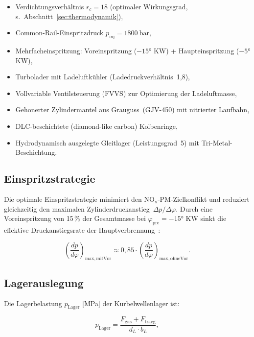 ﻿\documentclass[12pt,a4paper]{article}
\newcommand{\NOx}{\ensuremath{\mathrm{NO_x}}}
\newcommand{\rc}{\ensuremath{r_c}}
\begin{document}
\begin{itemize}
  \item Verdichtungsverhältnis $\rc = 18$ (optimaler Wirkungsgrad, s.\
        Abschnitt~\ref{sec:thermodynamik}),
  \item Common-Rail-Einspritzdruck $p_{\mathrm{inj}} = \SI{1800}{\bar}$,
  \item Mehrfacheinspritzung: Voreinspritzung ($-15 °$ KW) + Haupteinspritzung ($-5 °$ KW),
  \item Turbolader mit Ladeluftkühler (Ladedruckverhältnis~1{,}8),
  \item Vollvariable Ventilsteuerung (FVVS) zur Optimierung der Ladeluftmasse,
  \item Gehonerter Zylindermantel aus Grauguss~(GJV-450) mit nitrierter Laufbahn,
  \item DLC-beschichtete (diamond-like carbon) Kolbenringe,
  \item Hydrodynamisch ausgelegte Gleitlager (Leistungsgrad~5) mit
        Tri-Metal-Beschichtung.
\end{itemize}

\subsection{Einspritzstrategie}
\label{sec:motor_einspritzung}

Die optimale Einspritzstrategie minimiert den $\NOx$-PM-Zielkonflikt und
reduziert gleichzeitig den maximalen Zylinderdruckanstieg~$\Delta p / \Delta\varphi$.
Durch eine Voreinspritzung von 15\,\% der Gesamtmasse bei $\varphi_{\mathrm{pre}} = -15 °$ KW
sinkt die effektive Druckanstiegsrate der Hauptverbrennung~\cite{mollenhauer2010}:

\begin{equation}
  \left(\frac{dp}{d\varphi}\right)_{\mathrm{max, mit Vor}} \approx
  0{,}85 \cdot \left(\frac{dp}{d\varphi}\right)_{\mathrm{max, ohne Vor}}.
\end{equation}

\subsection{Lagerauslegung}
\label{sec:motor_lager}

Die Lagerbelastung $p_{\mathrm{Lager}}$ [\si{\MPa}] der Kurbelwellenlager ist:

\begin{equation}
  p_{\mathrm{Lager}} = \frac{F_{\mathrm{gas}} + F_{\mathrm{traeg}}}{d_L \cdot b_L},
  \label{eq:lager_belastung}
\end{equation}
\end{document}

